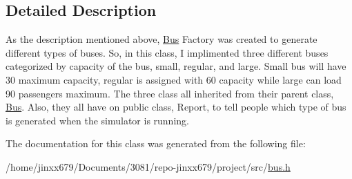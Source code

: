 \subsection{Detailed Description}
As the description mentioned above, \hyperlink{classBus}{Bus} Factory was created to generate different types of buses. So, in this class, I implimented three different buses categorized by capacity of the bus, small, regular, and large. Small bus will have 30 maximum capacity, regular is assigned with 60 capacity while large can load 90 passengers maximum. The three class all inherited from their parent class, \hyperlink{classBus}{Bus}. Also, they all have on public class, Report, to tell people which type of bus is generated when the simulator is running. 

The documentation for this class was generated from the following file\+:\begin{DoxyCompactItemize}
\item 
/home/jinxx679/\+Documents/3081/repo-\/jinxx679/project/src/\hyperlink{bus_8h}{bus.\+h}\end{DoxyCompactItemize}
